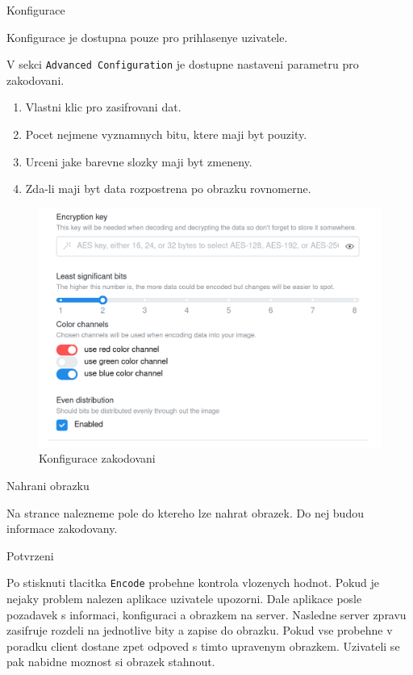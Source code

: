 \begin{subsubsection}{Konfigurace}\label{subsubsec:enc-konfigurace}

Konfigurace je dostupna pouze pro prihlasenye uzivatele.

V sekci \texttt{Advanced Configuration} je dostupne nastaveni parametru
pro zakodovani.

\begin{enumerate}
    \item Vlastni klic pro zasifrovani dat.
    \item Pocet nejmene vyznamnych bitu, ktere maji byt pouzity.
    \item Urceni jake barevne slozky maji byt zmeneny.
    \item Zda-li maji byt data rozpostrena po obrazku rovnomerne.
\end{enumerate}

\end{subsubsection}

\begin{figure}
    \centering
    \includegraphics[scale=0.5]{assets/images/encode-configuration}
    \caption{Konfigurace zakodovani}\label{fig:konfigurace-zakodovani}
\end{figure}

\begin{subsubsection}{Nahrani obrazku}\label{subsubsec:enc-nahrani-obrazku}

Na strance nalezneme pole do ktereho lze nahrat obrazek.
Do nej budou informace zakodovany.

\end{subsubsection}

\begin{subsubsection}{Potvrzeni}\label{subsubsec:enc-potvrzeni}

Po stisknuti tlacitka \texttt{Encode} probehne kontrola vlozenych hodnot.
Pokud je nejaky problem nalezen aplikace uzivatele upozorni.
Dale aplikace posle pozadavek s informaci, konfiguraci a
obrazkem na server.
Nasledne server zpravu zasifruje rozdeli na jednotlive bity a zapise do obrazku.
Pokud vse probehne v poradku client dostane zpet odpoved s timto upravenym
obrazkem.
Uzivateli se pak nabidne moznost si obrazek stahnout.

\end{subsubsection}

